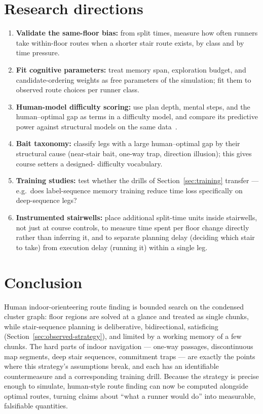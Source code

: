 \documentclass[11pt,a4paper,twocolumn]{article}
\begin{document}
\section{Research directions}

\begin{enumerate}
    \item \textbf{Validate the same-floor bias:} from split times,
          measure how often runners take within-floor routes when a shorter
          stair route exists, by class and by time pressure.
    \item \textbf{Fit cognitive parameters:} treat memory span, exploration
          budget, and candidate-ordering weights as free parameters of the
          simulation; fit them to observed route choices per runner class.
    \item \textbf{Human-model difficulty scoring:} use plan depth, mental
          steps, and the human--optimal gap as terms in a difficulty model,
          and compare its predictive power against structural models on the
          same data~\cite{framework}.
    \item \textbf{Bait taxonomy:} classify legs with a large human--optimal
          gap by their structural cause (near-stair bait, one-way trap,
          direction illusion); this gives course setters a designed-%
          difficulty vocabulary.
    \item \textbf{Training studies:} test whether the drills of
          Section~\ref{sec:training} transfer --- e.g.\ does label-sequence
          memory training reduce time loss specifically on deep-sequence
          legs?
    \item \textbf{Instrumented stairwells:} place additional split-time
          units inside stairwells, not just at course controls, to measure
          time spent per floor change directly rather than inferring it, and
          to separate planning delay (deciding which stair to take) from
          execution delay (running it) within a single leg.
\end{enumerate}

\section{Conclusion}

Human indoor-orienteering route finding is bounded search on the condensed
cluster graph: floor regions are solved at a glance and treated as single
chunks, while stair-sequence planning is deliberative, bidirectional,
satisficing (Section~\ref{sec:observed-strategy}), and limited by a working
memory of a few chunks. The hard parts
of indoor navigation --- one-way passages, discontinuous map segments, deep
stair sequences, commitment traps --- are exactly the points where this
strategy's assumptions break, and each has an identifiable countermeasure and
a corresponding training drill. Because the strategy is precise enough to
simulate, human-style route finding can now be computed alongside optimal
routes, turning claims about ``what a runner would do'' into measurable,
falsifiable quantities.
\end{document}
